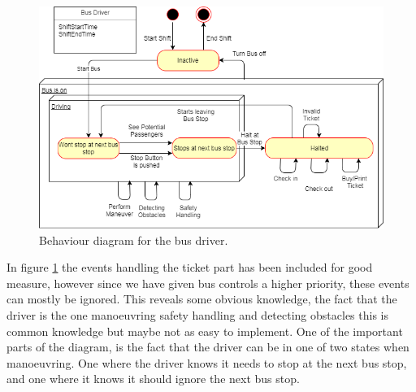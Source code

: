 \begin{figure}[H]
\centering
\includegraphics[scale=0.6]{Images/BehaviorDiagramBusDriver.png}
\caption{Behaviour diagram for the bus driver.}
\label{BehaviorDiagramBusDriver}
\end{figure}

In figure \ref{BehaviorDiagramBusDriver} the events handling the ticket part has been included for good measure, however since we have given bus controls a higher priority, these events can mostly be ignored. This reveals some obvious knowledge, the fact that the driver is the one manoeuvring safety handling and detecting obstacles this is common knowledge but maybe not as easy to implement. One of the important parts of the diagram, is the fact that the driver can be in one of two states when manoeuvring. One where the driver knows it needs to stop at the next bus stop, and one where it knows it should ignore the next bus stop. 








